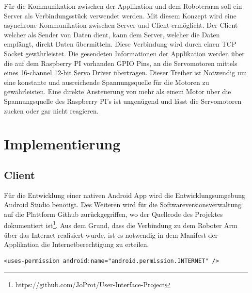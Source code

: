 \documentclass[12pt,					%
							 oneside,			%
							 a4paper,			%
							 halfparskip,		%
							 liststotoc,			%
							 bibtotoc,			%
							 fleqn,				%
							 pointlessnumbers]	%
							 {scrreprt}
\begin{document}

Für die Kommunikation zwischen der Applikation und dem \glqq{}Roboterarm\grqq{} soll ein Server als Verbindungsstück verwendet werden. Mit diesem Konzept wird eine asynchrone Kommunikation zwischen Server und Client ermöglicht. Der Client welcher als Sender von Daten dient, kann dem Server, welcher die Daten empfängt, direkt Daten übermitteln. Diese Verbindung wird durch einen TCP Socket gewährleistet. Die gesendeten Informationen der Applikation werden über die auf dem Raspberry PI vorhanden GPIO Pins, an die Servomotoren mittels eines  \glqq{}16-channel 12-bit Servo Driver\grqq{} übertragen. Dieser Treiber ist Notwendig um eine konstante und ausreichende Spannungsquelle für die Motoren zu gewährleisten. Eine direkte Ansteuerung von mehr als einem Motor über die Spannungsquelle des Raspberry PI's ist ungenügend und lässt die Servomotoren zucken oder gar nicht reagieren.


\chapter{Implementierung}	
\section{Client}
Für die Entwicklung einer nativen Android App wird die Entwicklungsumgebung Android Studio benötigt. Des Weiteren wird für die Softwareversionsverwaltung auf die Plattform Github zurückgegriffen, wo der Quellcode des Projektes dokumentiert ist\footnote{https://github.com/JoProt/User-Interface-Project}. Aus dem Grund, dass die Verbindung zu dem Roboter Arm über das Internet realisiert wurde, ist es notwendig in dem Manifest der Applikation die Internetberechtigung zu erteilen. \\
\begin{lstlisting}
<uses-permission android:name="android.permission.INTERNET" />
\end{lstlisting}
\end{document}

